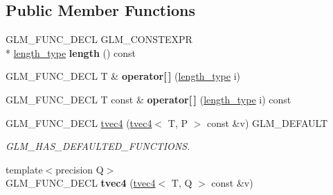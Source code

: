 \subsection*{Public Member Functions}
\begin{DoxyCompactItemize}
\item 
\hypertarget{structglm_1_1tvec4_a148946295a8bbdf4fc950952aa60c988}{G\-L\-M\-\_\-\-F\-U\-N\-C\-\_\-\-D\-E\-C\-L G\-L\-M\-\_\-\-C\-O\-N\-S\-T\-E\-X\-P\-R \\*
\hyperlink{structglm_1_1tvec4_a4e2b34a427cac7e72b6f73173c206feb}{length\-\_\-type} {\bfseries length} () const }\label{structglm_1_1tvec4_a148946295a8bbdf4fc950952aa60c988}

\item 
\hypertarget{structglm_1_1tvec4_a036a73844fb59380b1149744e1ddd2b2}{G\-L\-M\-\_\-\-F\-U\-N\-C\-\_\-\-D\-E\-C\-L T \& {\bfseries operator\mbox{[}$\,$\mbox{]}} (\hyperlink{structglm_1_1tvec4_a4e2b34a427cac7e72b6f73173c206feb}{length\-\_\-type} i)}\label{structglm_1_1tvec4_a036a73844fb59380b1149744e1ddd2b2}

\item 
\hypertarget{structglm_1_1tvec4_a5bb34b89cb6d008556484ebd13b54b80}{G\-L\-M\-\_\-\-F\-U\-N\-C\-\_\-\-D\-E\-C\-L T const \& {\bfseries operator\mbox{[}$\,$\mbox{]}} (\hyperlink{structglm_1_1tvec4_a4e2b34a427cac7e72b6f73173c206feb}{length\-\_\-type} i) const }\label{structglm_1_1tvec4_a5bb34b89cb6d008556484ebd13b54b80}

\item 
\hypertarget{structglm_1_1tvec4_a0f0111d2bbe7df9073ab9bac02207fd7}{G\-L\-M\-\_\-\-F\-U\-N\-C\-\_\-\-D\-E\-C\-L \hyperlink{structglm_1_1tvec4_a0f0111d2bbe7df9073ab9bac02207fd7}{tvec4} (\hyperlink{structglm_1_1tvec4}{tvec4}$<$ T, P $>$ const \&v) G\-L\-M\-\_\-\-D\-E\-F\-A\-U\-L\-T}\label{structglm_1_1tvec4_a0f0111d2bbe7df9073ab9bac02207fd7}

\begin{DoxyCompactList}\small\item\em G\-L\-M\-\_\-\-H\-A\-S\-\_\-\-D\-E\-F\-A\-U\-L\-T\-E\-D\-\_\-\-F\-U\-N\-C\-T\-I\-O\-N\-S. \end{DoxyCompactList}\item 
\hypertarget{structglm_1_1tvec4_af7f49516a64422ac3ec7856a7ee53efb}{{\footnotesize template$<$precision Q$>$ }\\G\-L\-M\-\_\-\-F\-U\-N\-C\-\_\-\-D\-E\-C\-L {\bfseries tvec4} (\hyperlink{structglm_1_1tvec4}{tvec4}$<$ T, Q $>$ const \&v)}\label{structglm_1_1tvec4_af7f49516a64422ac3ec7856a7ee53efb}


\end{DoxyCompactItemize}
